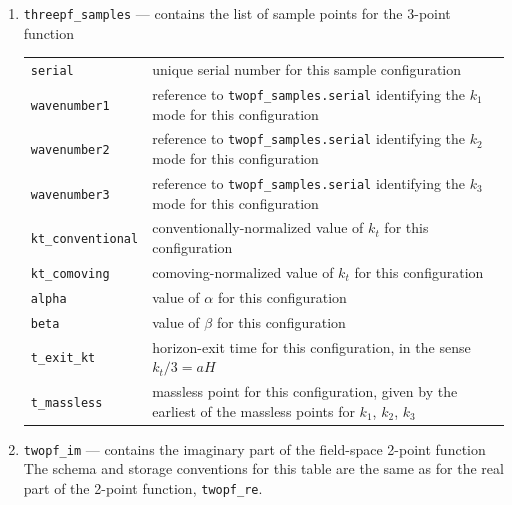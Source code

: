 \documentclass[11pt,a4paper]{article}
\newenvironment{sqltablelist}{\renewcommand{\arraystretch}{1.3}\small}{}
\begin{document}
\begin{sqltablelist}
\begin{enumerate}
    \item \label{sqltable:threepf-samples}
    \texttt{threepf_samples} --- contains the list of sample points for the 3-point function \\
    \begin{tabular}{p{2.5cm}p{11.2cm}}
        \texttt{serial} & unique serial number for this sample configuration \\
        \texttt{wavenumber1} & reference to \texttt{twopf_samples.serial} identifying
        the $k_1$ mode for this configuration \\
        \texttt{wavenumber2} & reference to \texttt{twopf_samples.serial} identifying
        the $k_2$ mode for this configuration \\
        \texttt{wavenumber3} & reference to \texttt{twopf_samples.serial} identifying
        the $k_3$ mode for this configuration \\
        \texttt{kt_conventional} & conventionally-normalized value of $k_t$ for this configuration \\
        \texttt{kt_comoving} & comoving-normalized value of $k_t$ for this configuration \\
        \texttt{alpha} & value of $\alpha$ for this configuration \\
        \texttt{beta} & value of $\beta$ for this configuration \\
        \texttt{t_exit_kt} & horizon-exit time for this configuration, in the sense
        $k_t / 3 = aH$ \\
        \texttt{t_massless} & massless point for this configuration, given by the earliest
        of the massless points for $k_1$, $k_2$, $k_3$
    \end{tabular}

    \item \texttt{twopf_im} --- contains the imaginary part of the field-space 2-point function \\
    The schema and storage conventions
    for this table are the same as for the real part of the 2-point function,
    \texttt{twopf_re}.
    

\end{enumerate}
\end{sqltablelist}
\end{document}
